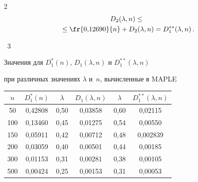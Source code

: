 \begin{multicols}{2}
\begin{multline}
  D_2(\lambda,n) \leq {}\\


  {}\leq \fr{0{,}12690}{n} +D_2(\lambda,n)=D_1^{**}(\lambda,n)\,.


  \label{g6a}


\end{multline}










\noindent


\begin{center}


\parbox{80mm}{{\tablename~3}\ \ \small{Значения для $D^*_1(n)$, $D_1(\lambda,n)$ и $D_1^{**}(\lambda,n)$ 


при различных значениях  $\lambda$  и~$n$, вычисленные в    MAPLE}}







\vspace*{2ex}




{\small


\begin{tabular}{|c|c||c|c||c|c|}


\hline


$n$ & $D^*_1(n)$ & $\lambda$ &   $D_1(\lambda,n)$ & $\lambda$ &   $D_1^{**}(\lambda,n)$\\


\hline


\hphantom{9}50   & 0,42808 & 0,50 & 0,03858 & 0,60 & 0,02115\\


100   & 0,13460 & 0,45 & 0,01275 & 0,54 & 0,00550\\


150  & 0,05911 & 0,42 & 0,00712 & 0,48 & \hphantom{9}0,002839\\


200  & 0,03059 & 0,40 & 0,00501 & 0,44 & 0,00185\\


300& 0,01153 & 0,31 & 0,00281 & 0,38 & 0,00105\\


500 & 0,00424 & 0,25 & 0,00153 & 0,31 & 0,00053\\



\end{tabular}}
\end{center}
\end{multicols}
